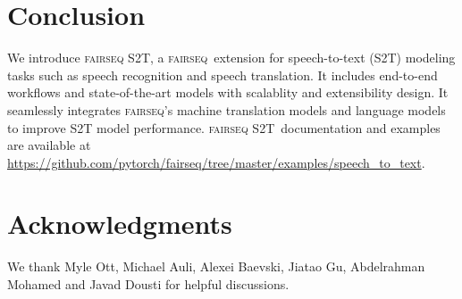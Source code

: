 \documentclass[11pt,a4paper]{article}
\newcommand{\fairseq}{\textsc{fairseq}}
\newcommand{\stot}{\textsc{fairseq S2T}}
\begin{document}
\section{Conclusion}
We introduce \stot, a \fairseq~extension for speech-to-text (S2T) modeling tasks such as speech recognition and speech translation. It includes end-to-end workflows and state-of-the-art models with scalablity and extensibility design. It seamlessly integrates \fairseq's machine translation models and language models to improve S2T model performance. \stot~documentation and examples are available at \url{https://github.com/pytorch/fairseq/tree/master/examples/speech_to_text}.

\section*{Acknowledgments}
We thank Myle Ott, Michael Auli, Alexei Baevski, Jiatao Gu, Abdelrahman Mohamed and Javad Dousti for helpful discussions.



\end{document}
